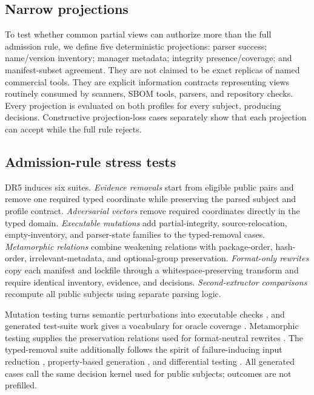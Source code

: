 \documentclass[10pt,conference]{IEEEtran}
\begin{document}
\subsection{Narrow projections}
To test whether common partial views can authorize more than the full admission rule, we define five deterministic projections: parser success; name/version inventory; manager metadata; integrity presence/coverage; and manifest-subset agreement. They are not claimed to be exact replicas of named commercial tools. They are explicit information contracts representing views routinely consumed by scanners, SBOM tools, parsers, and repository checks. Every projection is evaluated on both profiles for every subject, producing \ProjectionDecisions{} decisions. Constructive projection-loss cases separately show that each projection can accept while the full rule rejects.

\subsection{Admission-rule stress tests}
DR5 induces six suites. \emph{Evidence removals} start from eligible public pairs and remove one required typed coordinate while preserving the parsed subject and profile contract. \emph{Adversarial vectors} remove required coordinates directly in the typed domain. \emph{Executable mutations} add partial-integrity, source-relocation, empty-inventory, and parser-state families to the typed-removal cases. \emph{Metamorphic relations} combine weakening relations with package-order, hash-order, irrelevant-metadata, and optional-group preservation. \emph{Format-only rewrites} copy each manifest and lockfile through a whitespace-preserving transform and require identical inventory, evidence, and decisions. \emph{Second-extractor comparisons} recompute all public subjects using separate parsing logic.

Mutation testing turns semantic perturbations into executable checks \cite{jia2011mutation}, and generated test-suite work gives a vocabulary for oracle coverage \cite{fraser2011evosuite}. Metamorphic testing supplies the preservation relations used for format-neutral rewrites \cite{segura2016metamorphic}. The typed-removal suite additionally follows the spirit of failure-inducing input reduction \cite{zeller2002simplifying}, property-based generation \cite{claessen2000quickcheck}, and differential testing \cite{yang2011csmith}. All generated cases call the same decision kernel used for public subjects; outcomes are not prefilled.
\end{document}
